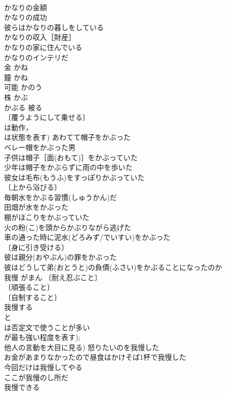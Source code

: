 \documentclass[8pt]{extreport}
\begin{document}
\begin{CJK}{UTF8}{min}
\\	かなりの金額 
\\	かなりの成功 
\\	彼らはかなりの暮しをしている 
\\	かなりの収入［財産］ 
\\	かなりの家に住んでいる 
\\	かなりのインテリだ 
\\	金	かね	
\\	鐘	かね	
\\	可能	かのう	
\\	株	かぶ	
\\	かぶる	被る	
\\	〔覆うようにして乗せる〕
\\	は動作，
\\	は状態を表す) あわてて帽子をかぶった 
\\	ベレー帽をかぶった男 
\\	子供は帽子［面(おもて)］をかぶっていた 
\\	少年は帽子をかぶらずに雨の中を歩いた 
\\	彼女は毛布(もうふ)をすっぽりかぶっていた 
\\	〔上から浴びる〕　
\\	毎朝水をかぶる習慣(しゅうかん)だ 
\\	田畑が水をかぶった 
\\	棚がほこりをかぶっていた 
\\	火の粉(こ)を頭からかぶりながら逃げた 
\\	車の通った時に泥水(どろみず/でいすい)をかぶった 
\\	〔身に引き受ける〕　
\\	彼は親分(おやぶん)の罪をかぶった 
\\	彼はどうして弟(おとうと)の負債(ふさい)をかぶることになったのか 
\\	我慢	がまん	〔耐え忍ぶこと〕
\\	〔頑張ること〕
\\	〔自制すること〕
\\	我慢する 
\\	と
\\	は否定文で使うことが多い
\\	が最も強い程度を表す); 
\\	他人の言動を大目に見る) 怒りたいのを我慢した 
\\	お金があまりなかったので昼食はかけそば1杯で我慢した 
\\	今回だけは我慢してやる 
\\	ここが我慢のし所だ 
\\	我慢できる 

\end{CJK}
\end{document}
